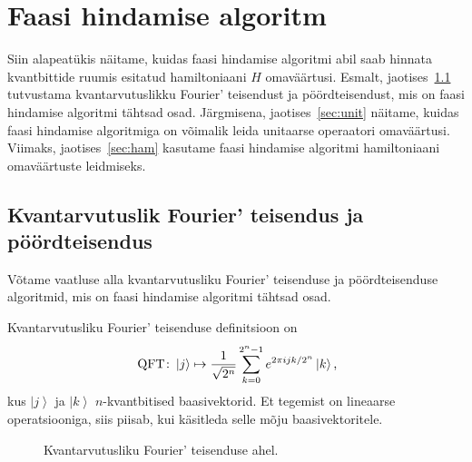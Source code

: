 \documentclass[12pt]{report}
\def\ket#1{\left|#1\right>}
\def\QFT{\mathop{\rm QFT}\nolimits}
\begin{document}
\section{Faasi hindamise algoritm}\label{sec:pea}

Siin alapeatükis näitame, kuidas faasi hindamise algoritmi abil saab hinnata kvantbittide ruumis esitatud hamiltoniaani \(H\) omaväärtusi.
Esmalt, jaotises~\ref{sec:qftdef} tutvustama kvantarvutuslikku Fourier' teisendust ja pöördteisendust, mis on faasi hindamise algoritmi tähtsad osad.
Järgmisena, jaotises~\ref{sec:unit} näitame, kuidas faasi hindamise algoritmiga on võimalik leida unitaarse operaatori omaväärtusi.
Viimaks, jaotises~\ref{sec:ham} kasutame faasi hindamise algoritmi hamiltoniaani omaväärtuste leidmiseks.

\subsection{Kvantarvutuslik Fourier' teisendus ja pöördteisendus}\label{sec:qftdef}

Võtame vaatluse alla kvantarvutusliku Fourier' teisenduse ja pöördteisenduse algoritmid, mis on faasi hindamise algoritmi tähtsad osad.

Kvantarvutusliku Fourier' teisenduse definitsioon on
\begin{align}\label{eq:qftdef}
    \QFT\colon
    \ket{j} \mapsto \frac{1}{\sqrt{2^n}} \sum_{k=0}^{2^n-1} e^{2\pi ijk/2^n} \ket{k} \rlap{,}
\end{align}
kus \(\ket{j}\) ja \(\ket{k}\) \(n\)-kvantbitised baasivektorid.
Et tegemist on lineaarse operatsiooniga, siis piisab, kui käsitleda selle mõju baasivektoritele.

\begin{figure}
    \centering
    \ifdefined\yquanton
    \fi
    \caption{Kvantarvutusliku Fourier' teisenduse ahel.}
    \label{fig:qft}
\end{figure}
\end{document}
